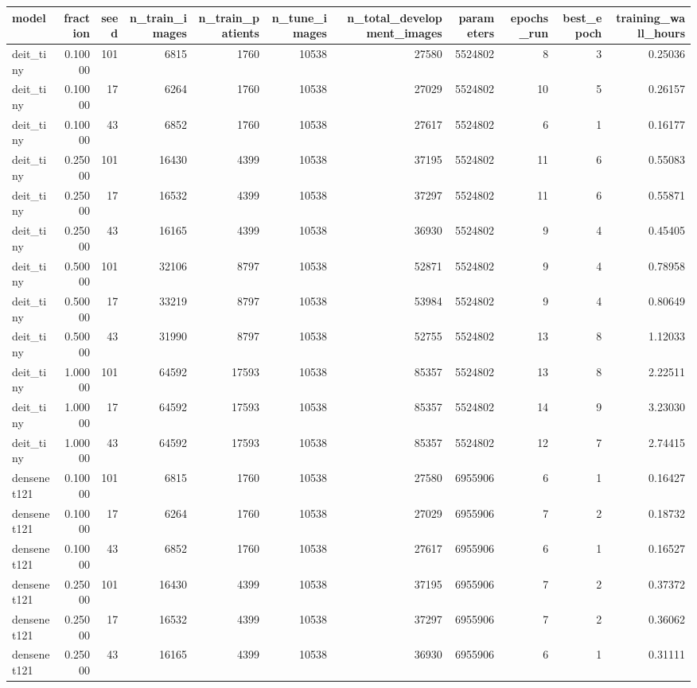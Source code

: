 \begin{tabular}{lrrrrrrrrrr}
\toprule
model & fraction & seed & n\_train\_images & n\_train\_patients & n\_tune\_images & n\_total\_development\_images & parameters & epochs\_run & best\_epoch & training\_wall\_hours \\
\midrule
deit\_tiny & 0.10000 & 101 & 6815 & 1760 & 10538 & 27580 & 5524802 & 8 & 3 & 0.25036 \\
deit\_tiny & 0.10000 & 17 & 6264 & 1760 & 10538 & 27029 & 5524802 & 10 & 5 & 0.26157 \\
deit\_tiny & 0.10000 & 43 & 6852 & 1760 & 10538 & 27617 & 5524802 & 6 & 1 & 0.16177 \\
deit\_tiny & 0.25000 & 101 & 16430 & 4399 & 10538 & 37195 & 5524802 & 11 & 6 & 0.55083 \\
deit\_tiny & 0.25000 & 17 & 16532 & 4399 & 10538 & 37297 & 5524802 & 11 & 6 & 0.55871 \\
deit\_tiny & 0.25000 & 43 & 16165 & 4399 & 10538 & 36930 & 5524802 & 9 & 4 & 0.45405 \\
deit\_tiny & 0.50000 & 101 & 32106 & 8797 & 10538 & 52871 & 5524802 & 9 & 4 & 0.78958 \\
deit\_tiny & 0.50000 & 17 & 33219 & 8797 & 10538 & 53984 & 5524802 & 9 & 4 & 0.80649 \\
deit\_tiny & 0.50000 & 43 & 31990 & 8797 & 10538 & 52755 & 5524802 & 13 & 8 & 1.12033 \\
deit\_tiny & 1.00000 & 101 & 64592 & 17593 & 10538 & 85357 & 5524802 & 13 & 8 & 2.22511 \\
deit\_tiny & 1.00000 & 17 & 64592 & 17593 & 10538 & 85357 & 5524802 & 14 & 9 & 3.23030 \\
deit\_tiny & 1.00000 & 43 & 64592 & 17593 & 10538 & 85357 & 5524802 & 12 & 7 & 2.74415 \\
densenet121 & 0.10000 & 101 & 6815 & 1760 & 10538 & 27580 & 6955906 & 6 & 1 & 0.16427 \\
densenet121 & 0.10000 & 17 & 6264 & 1760 & 10538 & 27029 & 6955906 & 7 & 2 & 0.18732 \\
densenet121 & 0.10000 & 43 & 6852 & 1760 & 10538 & 27617 & 6955906 & 6 & 1 & 0.16527 \\
densenet121 & 0.25000 & 101 & 16430 & 4399 & 10538 & 37195 & 6955906 & 7 & 2 & 0.37372 \\
densenet121 & 0.25000 & 17 & 16532 & 4399 & 10538 & 37297 & 6955906 & 7 & 2 & 0.36062 \\
densenet121 & 0.25000 & 43 & 16165 & 4399 & 10538 & 36930 & 6955906 & 6 & 1 & 0.31111 \\

\end{tabular}
